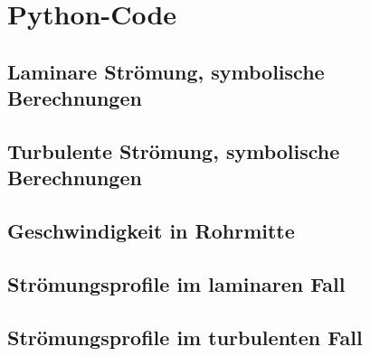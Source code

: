 \section{Python-Code}
\label{app:python}


\subsection{Laminare Str\"omung, symbolische Berechnungen}
\label{app:python:Qlaminar}



\clearpage
\subsection{Turbulente Str\"omung, symbolische Berechnungen}
\label{app:python:Qturb}



\clearpage
\subsection{Geschwindigkeit in Rohrmitte}
\label{app:python:rohrmitte}



\clearpage
\subsection{Str\"omungsprofile im laminaren Fall}
\label{app:python:laminar}



\clearpage
\subsection{Str\"omungsprofile im turbulenten Fall}
\label{app:python:turbulent}



